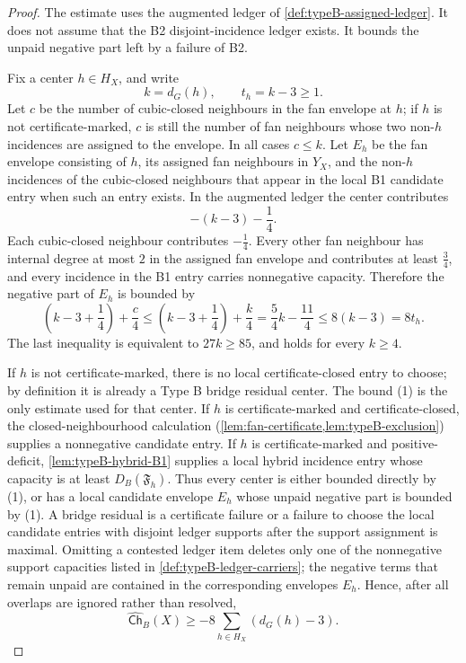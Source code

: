 \documentclass[11pt]{article}
\newcommand{\Ch}{\mathsf{Ch}}
\begin{document}
\begin{proof}
The estimate uses the augmented ledger of \cref{def:typeB-assigned-ledger}.  It
does not assume that the B2 disjoint-incidence ledger exists.  It bounds the
unpaid negative part left by a failure of B2.

Fix a center $h\in H_X$, and write
\[
k=d_G(h),\qquad t_h=k-3\ge1.
\]
Let $c$ be the number of cubic-closed neighbours in the fan envelope at $h$; if
$h$ is not certificate-marked, $c$ is still the number of fan neighbours whose
two non-$h$ incidences are assigned to the envelope.  In all cases $c\le k$.
Let $E_h$ be the fan envelope consisting of $h$, its assigned fan neighbours in
$Y_X$, and the non-$h$ incidences of the cubic-closed neighbours that appear in
the local B1 candidate entry when such an entry exists.  In the augmented ledger
the center contributes
\[
-(k-3)-\frac14 .
\]
Each cubic-closed neighbour contributes $-\tfrac14$.  Every other fan neighbour
has internal degree at most $2$ in the assigned fan envelope and contributes at
least $\tfrac34$, and every incidence in the B1 entry carries
nonnegative capacity.  Therefore the negative part of $E_h$ is bounded by
\[
\left(k-3+\frac14\right)+\frac c4
\le
\left(k-3+\frac14\right)+\frac k4
=\frac54k-\frac{11}{4}
\le 8(k-3)=8t_h .
\tag{1}
\]
The last inequality is equivalent to $27k\ge85$, and holds for every $k\ge4$.

If $h$ is not certificate-marked, there is no local certificate-closed entry to
choose; by definition it is already a Type B bridge residual center.  The bound
(1) is the only estimate used for that center.  If $h$ is certificate-marked and
certificate-closed, the closed-neighbourhood calculation
(\cref{lem:fan-certificate,lem:typeB-exclusion}) supplies a nonnegative
candidate entry.  If $h$ is certificate-marked and positive-deficit,
\cref{lem:typeB-hybrid-B1} supplies a local hybrid incidence entry whose capacity
is at least $D_B(\mathfrak F_h)$.  Thus every center is either bounded directly
by (1), or has a local candidate envelope $E_h$ whose unpaid negative part is
bounded by (1).  A bridge residual is a certificate failure or a failure to
choose the local candidate entries with disjoint ledger supports after the support
assignment is maximal.  Omitting a contested ledger item deletes only one of the
nonnegative support capacities listed in \cref{def:typeB-ledger-carriers}; the
negative terms that remain unpaid are contained in the corresponding envelopes
$E_h$.  Hence, after all overlaps are ignored rather than resolved,
\[
\widehat{\Ch}_B(X)
\ge
-8\sum_{h\in H_X}(d_G(h)-3).
\tag{2}
\]


\end{proof}
\end{document}
